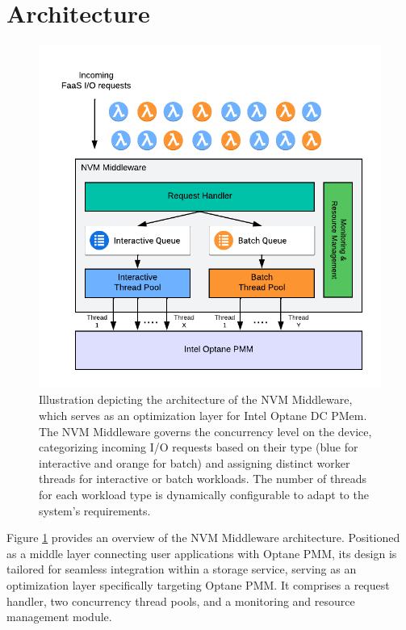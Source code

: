 \section{Architecture}

\begin{figure}[ht]
  \centering
  \includegraphics[scale=1]{images/nvm_design.png}
  \caption[NVM Middleware Architecture]{Illustration depicting the architecture of the NVM Middleware, which serves as an optimization layer for Intel Optane DC PMem. The NVM Middleware governs the concurrency level on the device, categorizing incoming I/O requests based on their type (blue for interactive and orange for batch) and assigning distinct worker threads for interactive or batch workloads. The number of threads for each workload type is dynamically configurable to adapt to the system's requirements.}
  \label{fig:nvm_architecture}
\end{figure}

Figure \ref{fig:nvm_architecture} provides an overview of the NVM Middleware architecture. Positioned as a middle layer connecting user applications with Optane PMM, its design is tailored for seamless integration within a storage service, serving as an optimization layer specifically targeting Optane PMM. It comprises a request handler, two concurrency thread pools, and a monitoring and resource management module.

